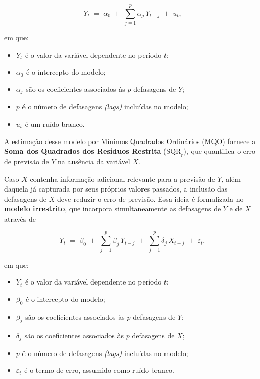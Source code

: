 \begin{equation}
    Y_t \;=\; \alpha_0 \;+\; \sum_{j=1}^{p} \alpha_j\, Y_{t-j} \;+\; u_t,
    \label{eq:restrito}
\end{equation}

\noindent em que:
\begin{itemize}
    \item $Y_t$ é o valor da variável dependente no período $t$;
    \item $\alpha_0$ é o intercepto do modelo;
    \item $\alpha_j$ são os coeficientes associados às $p$ defasagens de $Y$;
    \item $p$ é o número de defasagens \textit{(lags)} incluídas no modelo;
    \item $u_t$ é um ruído branco.
\end{itemize}

A estimação desse modelo por Mínimos Quadrados Ordinários (MQO) fornece a \textbf{Soma dos Quadrados dos Resíduos Restrita} ($\mathrm{SQR}_r$), que quantifica o erro de previsão de $Y$ na ausência da variável $X$.

Caso $X$ contenha informação adicional relevante para a previsão de $Y$, além daquela já capturada por seus próprios valores passados, a inclusão das defasagens de $X$ deve reduzir o erro de previsão. Essa ideia é formalizada no \textbf{modelo irrestrito}, que incorpora simultaneamente as defasagens de $Y$ e de $X$ através de

\begin{equation}
    Y_t \;=\; \beta_0 \;+\; \sum_{j=1}^{p} \beta_j\, Y_{t-j} \;+\; \sum_{j=1}^{p} \delta_j\, X_{t-j} \;+\; \varepsilon_t,
    \label{eq:irrestrito}
\end{equation}

\noindent em que:
\begin{itemize}
    \item $Y_t$ é o valor da variável dependente no período $t$;
    \item $\beta_0$ é o intercepto do modelo;
    \item $\beta_j$ são os coeficientes associados às $p$ defasagens de $Y$;
    \item $\delta_j$ são os coeficientes associados às $p$ defasagens de $X$;
    \item $p$ é o número de defasagens \textit{(lags)} incluídas no modelo;
    \item $\varepsilon_t$ é o termo de erro, assumido como ruído branco.
\end{itemize}

